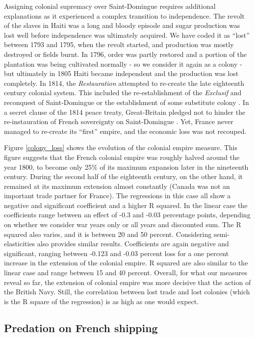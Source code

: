 \documentclass[12pt,a4paper,notitlepage,english]{article}
\begin{document}
Assigning colonial supremacy over Saint-Domingue requires additional explanations as it experienced a complex transition to independence. 
The revolt of the slaves in Haiti was a long and bloody episode and sugar production was lost well before independence was ultimately acquired.
We have coded it as ``lost'' between 1793 and 1795, when the revolt started, and production was mostly destroyed or fields burnt.
In 1796, order was partly restored and a portion of the plantation was being cultivated normally - so we consider it again as a colony - but ultimately in 1805 Haiti became independent and the production was lost completely.
In 1814, the \textit{Restauration} attempted to re-create the late eighteenth century colonial system.
This included the re-establishment of the \textit{Exclusif} and reconquest of Saint-Domingue or the establishment of some substitute colony \citep{Todd2011}.
In a secret clause of the 1814 peace treaty, Great-Britain pledged not to hinder the re-instauration of French sovereignty on Saint-Domingue \citep{Schefer1907}.
Yet, France never managed to re-create its ``first'' empire, and the economic loss was not recouped.

Figure \ref{colony_loss} shows the evolution of the colonial empire measure. This figure suggests that the French colonial empire was roughly halved around the year 1800, to become only 25\% of its maximum expansion later in the nineteenth century. During the second half of the eighteenth century, on the other hand, it remained at its maximum extension almost constantly (Canada was not an important trade partner for France).
The regressions in this case all show a negative and significant coefficient and a higher R squared. In the linear case the coefficients range between an effect of -0.3 and -0.03 percentage points, depending on whether we consider war years only or all years and discounted sum. The R squared also varies, and it is between 20 and 50 percent. Considering semi-elasticities also provides similar results. Coefficients are again negative and significant, ranging between -0.123 and -0.03 percent loss for a one percent increase in the extension of the colonial empire. R squared are also similar to the linear case and range between 15 and 40 percent.  
Overall, for what our measures reveal so far, the extension of colonial empire was more decisive that the action of the British Navy. Still, the correlation between lost trade and lost colonies (which is the R square of the regression) is as high as one would expect.  

\subsection{Predation on French shipping}\label{sec:DestructionofFrenchshipping}
\end{document}
